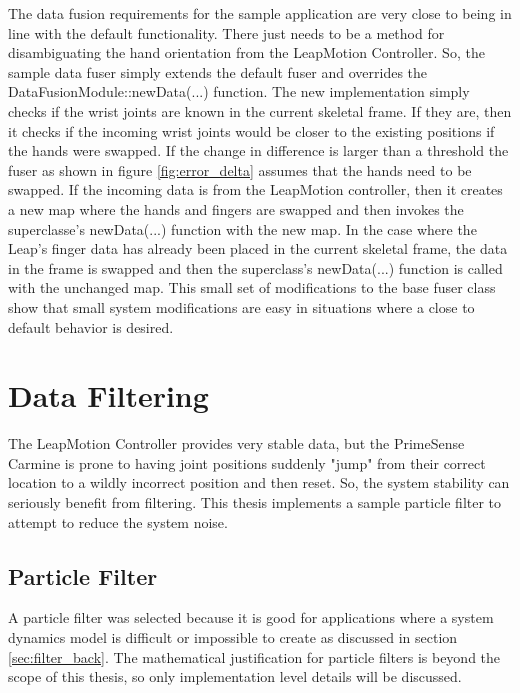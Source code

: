 The data fusion requirements for the sample application are very close to being in line with the default functionality. There just needs to be a method for disambiguating the hand orientation from the LeapMotion Controller. So, the sample data fuser simply extends the default fuser and overrides the DataFusionModule::newData(...) function. The new implementation simply checks if the wrist joints are known in the current skeletal frame. If they are, then it checks if the incoming wrist joints would be closer to the existing positions if the hands were swapped. If the change in difference is larger than a threshold the fuser as shown in figure \ref{fig:error_delta} assumes that the hands need to be swapped. If the incoming data is from the LeapMotion controller, then it creates a new map where the hands and fingers are swapped and then invokes the superclasse's newData(...) function with the new map. In the case where the Leap's finger data has already been placed in the current skeletal frame, the data in the frame is swapped and then the superclass's newData(...) function is called with the unchanged map. This small set of modifications to the base fuser class show that small system modifications are easy in situations where a close to default behavior is desired.

\section{Data Filtering}

The LeapMotion Controller provides very stable data, but the PrimeSense Carmine is prone to having joint positions suddenly "jump" from their correct location to a wildly incorrect position and then reset. So, the system stability can seriously benefit from filtering. This thesis implements a sample particle filter to attempt to reduce the system noise.

\subsection{Particle Filter}\label{sec:filer_impl}

A particle filter was selected because it is good for applications where a system dynamics model is difficult or impossible to create as discussed in section \ref{sec:filter_back}. The mathematical justification for particle filters is beyond the scope of this thesis, so only implementation level details will be discussed.

